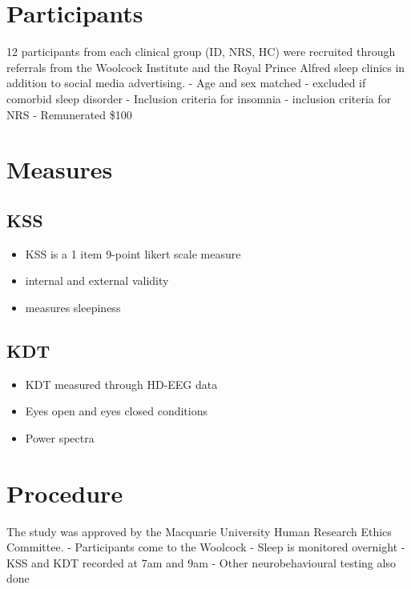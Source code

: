 \documentclass[12pt,a4paper,]{report}
\providecommand{\tightlist}{%
  \setlength{\itemsep}{0pt}\setlength{\parskip}{0pt}}
\begin{document}
\section{Participants}\label{participants}

12 participants from each clinical group (ID, NRS, HC) were recruited
through referrals from the Woolcock Institute and the Royal Prince
Alfred sleep clinics in addition to social media advertising. - Age and
sex matched - excluded if comorbid sleep disorder - Inclusion criteria
for insomnia - inclusion criteria for NRS - Remunerated \$100

\section{Measures}\label{measures}

\subsection{KSS}\label{kss}

\begin{itemize}
\tightlist
\item
  KSS is a 1 item 9-point likert scale measure
\item
  internal and external validity
\item
  measures sleepiness
\end{itemize}

\subsection{KDT}\label{kdt}

\begin{itemize}
\tightlist
\item
  KDT measured through HD-EEG data
\item
  Eyes open and eyes closed conditions
\item
  Power spectra
\end{itemize}

\section{Procedure}\label{procedure}

The study was approved by the Macquarie University Human Research Ethics
Committee. - Participants come to the Woolcock - Sleep is monitored
overnight - KSS and KDT recorded at 7am and 9am - Other neurobehavioural
testing also done
\end{document}
